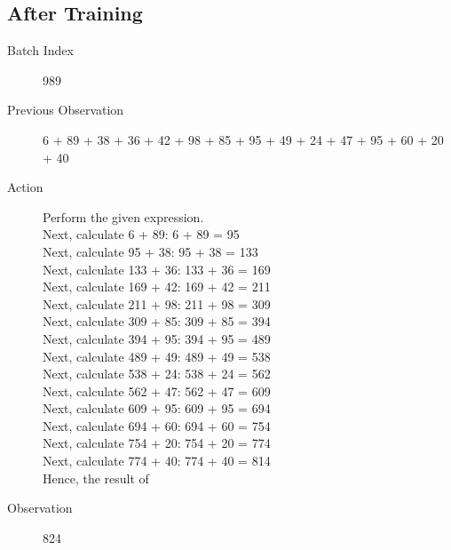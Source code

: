 \documentclass{article}
\theoremstyle{plain}
\theoremstyle{definition}
\theoremstyle{remark}
\begin{document}
\subsection{After Training}
\begin{description}
    \item[Batch Index] 989
    \item[Previous Observation] 6 + 89 + 38 + 36 + 42 + 98 + 85 + 95 + 49 + 24 + 47 + 95 + 60 + 20 + 40
    \item[Action] Perform the given expression.\\[1ex]
    Next, calculate 6 + 89: 6 + 89 = 95\\[1ex]
    Next, calculate 95 + 38: 95 + 38 = 133\\[1ex]
    Next, calculate 133 + 36: 133 + 36 = 169\\[1ex]
    Next, calculate 169 + 42: 169 + 42 = 211\\[1ex]
    Next, calculate 211 + 98: 211 + 98 = 309\\[1ex]
    Next, calculate 309 + 85: 309 + 85 = 394\\[1ex]
    Next, calculate 394 + 95: 394 + 95 = 489\\[1ex]
    Next, calculate 489 + 49: 489 + 49 = 538\\[1ex]
    Next, calculate 538 + 24: 538 + 24 = 562\\[1ex]
    Next, calculate 562 + 47: 562 + 47 = 609\\[1ex]
    Next, calculate 609 + 95: 609 + 95 = 694\\[1ex]
    Next, calculate 694 + 60: 694 + 60 = 754\\[1ex]
    Next, calculate 754 + 20: 754 + 20 = 774\\[1ex]
    Next, calculate 774 + 40: 774 + 40 = 814\\[1ex]
    Hence, the result of
    \item[Observation] 824
\end{description}
\end{document}
